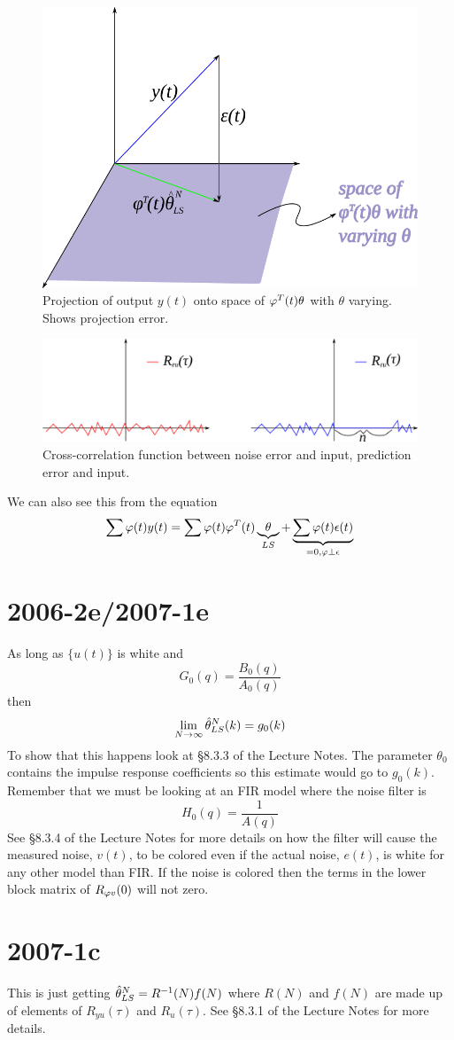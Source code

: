 \documentclass[lecture,12pt,]{pcms-l}
\begin{document}
\begin{figure}[ht!]
  \centering
  \includegraphics[width=.5\textwidth]{images/mt062d2}
  \caption{Projection of output $y(t)$ onto space of $\varphi^T(t)\theta$ with $\theta$ varying. Shows projection error.}
  \label{fig:mt062d2}
\end{figure}

\begin{figure}[ht!]
  \centering
  \includegraphics[width=.5\textwidth]{images/mt062d1}
  \caption{Cross-correlation function between noise error and input, prediction error and input.}
  \label{fig:mt062d1}
\end{figure}

We can also see this from the equation
$$\sum\varphi(t)y(t) = \sum\varphi(t)\varphi^T(t)\underbrace{\theta}_{LS} + \underbrace{\sum\varphi(t)\epsilon(t)}_{=0, \varphi\perp\epsilon}$$

\section{2006-2e/2007-1e}
As long as $\{u(t)\}$ is white and
$$G_0(q)=\frac{B_0(q)}{A_0(q)}$$
then
$$\lim_{N\to\infty}\hat{\theta}_{LS}^N(k)=g_0(k)$$
To show that this happens look at \S8.3.3 of the Lecture Notes. The parameter $\theta_0$ contains the impulse response coefficients so this estimate would go to $g_0(k)$. Remember that we must be looking at an FIR model where the noise filter is
$$H_0(q)=\frac{1}{A(q)}$$
See \S8.3.4 of the Lecture Notes for more details on how the filter will cause the measured noise, $v(t)$, to be colored even if the actual noise, $e(t)$, is white for any other model than FIR. If the noise is colored then the terms in the lower block matrix of $R_{\varphi v}(0)$ will not zero.

\section{2007-1c}
This is just getting $\hat{\theta}_{LS}^N=R^{-1}(N)f(N)$ where $R(N)$ and $f(N)$ are made up of elements of $R_{yu}(\tau)$ and $R_u(\tau)$. See \S8.3.1 of the Lecture Notes for more details.
\end{document}
